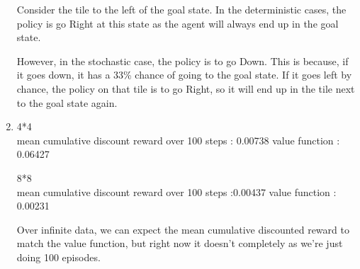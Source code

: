 \documentclass{article}
\begin{document}
\begin{enumerate}[label=(\alph*)]
Consider the tile to the left of the goal state. In the deterministic cases, the policy is go Right at this state as the agent will always end up in the goal state. 

However, in the stochastic case, the policy is to go Down. This is because, if it goes down, it has a 33\% chance of going to the goal state. If it goes left by chance, the policy on that tile is to go Right, so it will end up in the tile next to the goal state again. 

\item 

4*4 \\
mean cumulative discount reward over 100 steps : 0.00738
value function : 0.06427

8*8\\
mean cumulative discount reward over 100 steps :0.00437
value function : 0.00231

Over infinite data, we can expect the mean cumulative discounted reward to match the value function, but right now it doesn't completely as we're just doing 100 episodes. 

\end{enumerate}
\end{document}
